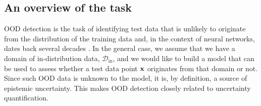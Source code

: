 \subsection{An overview of the task}
%
OOD detection is the task of identifying test data that is unlikely to originate from the distribution of the training data and, in the context of neural networks, dates back several decades \parencite{bishop_novelty_1994, chang_figure_1993}.
In the general case, we assume that we have a domain of in-distribution data, $\mathcal{D}_{\text{in}}$, and we would like to build a model that can be used to assess whether a test data point ${\mathbf{x}}$ originates from that domain or not. 
Since such OOD data is unknown to the model, it is, by definition, a source of epistemic uncertainty. This makes OOD detection closely related to uncertainty quantification. 

